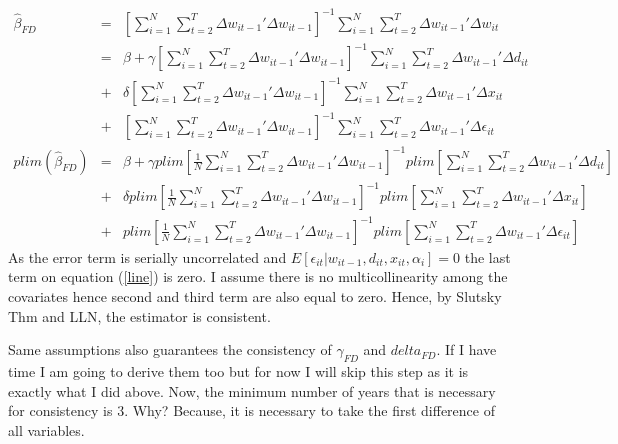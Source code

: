 \documentclass[11pt]{article}
\begin{document}
\begin{eqnarray}
\hat{\beta}_{FD} &=& \left[\sum\limits_{i=1}^{N}\sum\limits_{t=2}^{T} \Delta w_{it-1}'\Delta w_{it-1} \right]^{-1}\sum\limits_{i=1}^{N}\sum\limits_{t=2}^{T} \Delta w_{it-1}'\Delta w_{it} \nonumber \\
                 &=& \beta + \gamma \left[\sum\limits_{i=1}^{N}\sum\limits_{t=2}^{T} \Delta w_{it-1}'\Delta w_{it-1} \right]^{-1}\sum\limits_{i=1}^{N}\sum\limits_{t=2}^{T} \Delta w_{it-1}'\Delta d_{it} \nonumber \\
                 &+& \delta \left[\sum\limits_{i=1}^{N}\sum\limits_{t=2}^{T} \Delta w_{it-1}'\Delta w_{it-1} \right]^{-1}\sum\limits_{i=1}^{N}\sum\limits_{t=2}^{T} \Delta w_{it-1}'\Delta x_{it} \nonumber \\
                 &+&  \left[\sum\limits_{i=1}^{N}\sum\limits_{t=2}^{T} \Delta w_{it-1}'\Delta w_{it-1} \right]^{-1}\sum\limits_{i=1}^{N}\sum\limits_{t=2}^{T} \Delta w_{it-1}' \Delta \epsilon_{it} \nonumber \\
plim(\hat{\beta}_{FD}) &=& \beta + \gamma plim \left[\frac{1}{N}\sum\limits_{i=1}^{N}\sum\limits_{t=2}^{T} \Delta w_{it-1}'\Delta w_{it-1} \right]^{-1} plim\left[ \sum\limits_{i=1}^{N}\sum\limits_{t=2}^{T} \Delta w_{it-1}'\Delta d_{it} \right] \nonumber \\
                       &+& \delta plim \left[\frac{1}{N} \sum\limits_{i=1}^{N}\sum\limits_{t=2}^{T} \Delta w_{it-1}'\Delta w_{it-1} \right]^{-1} plim\left[ \sum\limits_{i=1}^{N}\sum\limits_{t=2}^{T} \Delta w_{it-1}'\Delta x_{it} \right] \nonumber \\
                       &+& plim \left[\frac{1}{N} \sum\limits_{i=1}^{N}\sum\limits_{t=2}^{T} \Delta w_{it-1}'\Delta w_{it-1} \right]^{-1} plim\left[ \sum\limits_{i=1}^{N}\sum\limits_{t=2}^{T} \Delta w_{it-1}'\Delta \epsilon_{it} \right] \label{line}
\end{eqnarray}
As the error term is serially uncorrelated and $E[\epsilon_{it}| w_{it-1}, d_{it}, x_{it}, \alpha_{i}]=0$ the last term on equation (\ref{line}) is zero. I assume there is no multicollinearity among the covariates hence second and third term are also equal to zero. Hence, by Slutsky Thm and LLN, the estimator is consistent. 

Same assumptions also guarantees the consistency of $\hat{\gamma}_{FD}$ and $\hat{delta}_{FD}$. If I have time I am going to derive them too but for now I will skip this step as it is exactly what I did above. Now, the minimum number of years that is necessary for consistency is 3. Why? Because, it is necessary to take the first difference of all variables.
\end{document}
